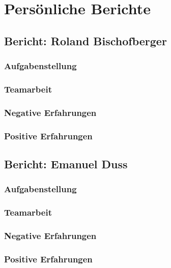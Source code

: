 \chapter{Persönliche Berichte}

\section{Bericht: Roland Bischofberger}

\subsection{Aufgabenstellung}
\subsection{Teamarbeit}
\subsection{Negative Erfahrungen}
\subsection{Positive Erfahrungen}


\section{Bericht: Emanuel Duss}

\subsection{Aufgabenstellung}
\subsection{Teamarbeit}
\subsection{Negative Erfahrungen}
\subsection{Positive Erfahrungen}
